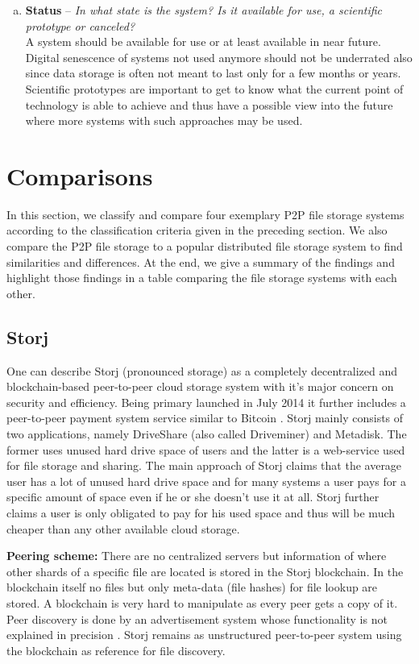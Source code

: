 \begin{enumerate}[(a)]
\item \textbf{Status} -- \textit{In what state is the system? Is it available for use, a scientific prototype or canceled?}\\
A system should be available for use or at least available in near future. Digital senescence of systems not used anymore should not be underrated also since data storage is often not meant to last only for a few months or years. Scientific prototypes are important to get to know what the current point of technology is able to achieve and thus have a possible view into the future where more systems with such approaches may be used.
\end{enumerate}

\section{Comparisons}
\label{comparisons}
In this section, we classify and compare four exemplary P2P file storage systems according to the classification criteria given in the preceding section. We also compare the P2P file storage to a popular distributed file storage system to find similarities and differences. At the end, we give a summary of the findings and highlight those findings in a table comparing the file storage systems with each other.

\subsection{Storj} %
One can describe Storj (pronounced storage) as a completely decentralized and blockchain-based peer-to-peer cloud storage system with it's major concern on security and efficiency. Being primary launched in July 2014 it further includes a peer-to-peer payment system service similar to Bitcoin \cite{storj:blog:what_is_storj}. Storj mainly consists of two applications, namely DriveShare (also called Driveminer) and Metadisk. The former uses unused hard drive space of users and the latter is a web-service used for file storage and sharing. The main approach of Storj claims that the average user has a lot of unused hard drive space and for many systems a user pays for a specific amount of space even if he or she doesn't use it at all. Storj further claims a user is only obligated to pay for his used space and thus will be much cheaper than any other available cloud storage.

\textbf{Peering scheme:} There are no centralized servers but information of where other shards of a specific file are located is stored in the Storj blockchain. In the blockchain itself no files but only meta-data (file hashes) for file lookup are stored. A blockchain is very hard to manipulate as every peer gets a copy of it. Peer discovery is done by an advertisement system whose functionality is not explained in precision \cite{storj:PDF}. Storj remains as unstructured peer-to-peer system using the blockchain as reference for file discovery.

